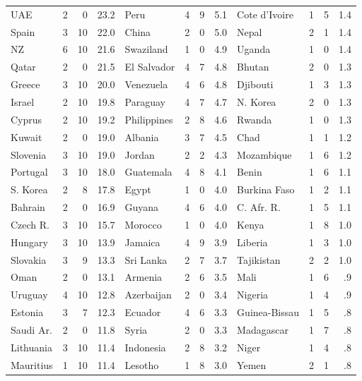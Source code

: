 \begin{table}
\begin{tabular}{|lrrr|lrrr|lrrr|}
UAE           & 2 &  0 &23.2 &Peru          & 4 &  9 & 5.1&Cote d'Ivoire&1& 5&  1.4\\
Spain         & 3 & 10 &22.0 &China         & 2 &  0 & 5.0&Nepal        &2& 1&  1.4\\
NZ            & 6 & 10 &21.6 &Swaziland     & 1 &  0 & 4.9&Uganda       &1& 0&  1.4\\
Qatar         & 2 &  0 &21.5 &El Salvador   & 4 &  7 & 4.8&Bhutan       &2& 0&  1.3\\
Greece        & 3 & 10 &20.0 &Venezuela     & 4 &  6 & 4.8&Djibouti     &1& 3&  1.3\\
Israel        & 2 & 10 &19.8 &Paraguay      & 4 &  7 & 4.7&N. Korea     &2& 0&  1.3\\
Cyprus        & 2 & 10 &19.2 &Philippines   & 2 &  8 & 4.6&Rwanda       &1& 0&  1.3\\
Kuwait        & 2 &  0 &19.0 &Albania       & 3 &  7 & 4.5&Chad         &1& 1&  1.2\\
Slovenia      & 3 & 10 &19.0 &Jordan        & 2 &  2 & 4.3&Mozambique   &1& 6&  1.2\\
Portugal      & 3 & 10 &18.0 &Guatemala     & 4 &  8 & 4.1&Benin        &1& 6&  1.1\\
S. Korea      & 2 &  8 &17.8 &Egypt         & 1 &  0 & 4.0&Burkina Faso &1& 2&  1.1\\
Bahrain       & 2 &  0 &16.9 &Guyana        & 4 &  6 & 4.0&C. Afr. R.   &1& 5&  1.1\\
Czech R.      & 3 & 10 &15.7 &Morocco       & 1 &  0 & 4.0&Kenya        &1& 8&  1.0\\
Hungary       & 3 & 10 &13.9 &Jamaica       & 4 &  9 & 3.9&Liberia      &1& 3&  1.0\\
Slovakia      & 3 &  9 &13.3 &Sri Lanka     & 2 &  7 & 3.7&Tajikistan   &2& 2&  1.0\\
Oman          & 2 &  0 &13.1 &Armenia       & 2 &  6 & 3.5&Mali         &1& 6&   .9\\
Uruguay       & 4 & 10 &12.8 &Azerbaijan    & 2 &  0 & 3.4&Nigeria      &1& 4&   .9\\
Estonia       & 3 &  7 &12.3 &Ecuador       & 4 &  6 & 3.3&Guinea-Bissau&1& 5&   .8\\
Saudi Ar.     & 2 &  0 &11.8 &Syria         & 2 &  0 & 3.3&Madagascar   &1& 7&   .8\\
Lithuania     & 3 & 10 &11.4 &Indonesia     & 2 &  8 & 3.2&Niger        &1& 4&   .8\\
Mauritius     & 1 & 10 &11.4 &Lesotho       & 1 &  8 & 3.0&Yemen        &2& 1&   .8\\

\end{tabular}
\end{table}
